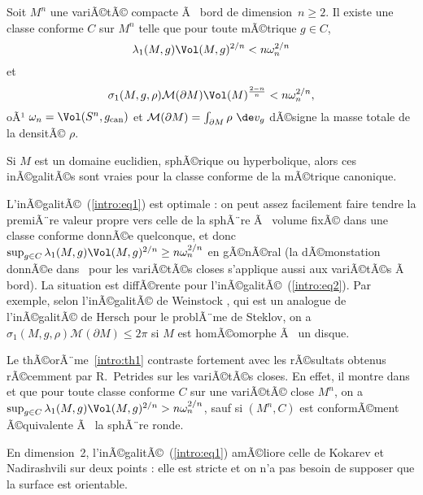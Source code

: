 \documentclass[11pt,a4paper]{smfart}
\begin{document}
\begin{theo}\label{intro:th1}
Soit $M^n$ une variÃ©tÃ© compacte Ã  bord de dimension~$n\geq2$. Il existe
une classe conforme $C$ sur $M^n$ telle que pour toute mÃ©trique $g\in C$,
\begin{equation}\label{intro:eq1}
\lambda_1(M,g)\Vol(M,g)^{2/n}< n\omega_n^{2/n}
\end{equation}
et
\begin{equation}\label{intro:eq2}
\sigma_1(M,g,\rho)\mathcal M(\partial M)\Vol(M)^{\frac{2-n}n}<
n\omega_n^{2/n},
\end{equation}
oÃ¹ $\omega_n=\Vol(S^n,g_{\textrm{can}})$ et
$\mathcal M(\partial M)=\int_{\partial M}\rho\ \de v_g$ dÃ©signe
la masse totale de la densitÃ© $\rho$.

Si $M$ est un domaine euclidien, sphÃ©rique ou hyperbolique,  alors ces
inÃ©galitÃ©s sont vraies pour la classe conforme de la mÃ©trique canonique.
\end{theo}
\begin{rema}
L'inÃ©galitÃ©~(\ref{intro:eq1}) est optimale : on peut
assez facilement faire tendre la premiÃ¨re valeur propre vers celle
de la sphÃ¨re Ã  volume fixÃ© dans une classe conforme donnÃ©e quelconque,
et donc $\sup_{g\in C}\lambda_1(M,g)\Vol(M,g)^{2/n}\geq n\omega_n^{2/n}$ en
gÃ©nÃ©ral
(la dÃ©monstation donnÃ©e dans~\cite{ces03} pour les variÃ©tÃ©s closes
s'applique aussi aux variÃ©tÃ©s Ã  bord).
La situation est diffÃ©rente pour l'inÃ©galitÃ©~(\ref{intro:eq2}). Par exemple,
selon l'inÃ©galitÃ© de Weinstock \cite{we54}, qui est un analogue de
l'inÃ©galitÃ© de Hersch pour le problÃ¨me de Steklov, on a
$\sigma_1(M,g,\rho)\mathcal M(\partial M)\leq2\pi$ si $M$ est homÃ©omorphe
Ã  un disque.
\end{rema}
\begin{rema}\label{intro:rkpe}
Le thÃ©orÃ¨me~\ref{intro:th1} contraste fortement avec les rÃ©sultats
obtenus rÃ©cemment par R.~Petrides sur les variÃ©tÃ©s closes. En effet,
il montre dans \cite{pe14} et \cite{pe13} que pour toute classe conforme
$C$ sur une variÃ©tÃ© close $M^n$, on a
$\sup_{g\in C}\lambda_1(M,g)\Vol(M,g)^{2/n}>n\omega_n^{2/n}$, sauf si
$(M^n,C)$ est conformÃ©ment Ã©quivalente Ã  la sphÃ¨re ronde.
\end{rema}
\begin{rema}
 En dimension~2, l'inÃ©galitÃ©~(\ref{intro:eq1}) amÃ©liore celle de
Kokarev et Nadirashvili sur deux points : elle est stricte et on n'a pas
besoin de supposer que la surface est orientable.
\end{rema}
\end{document}
